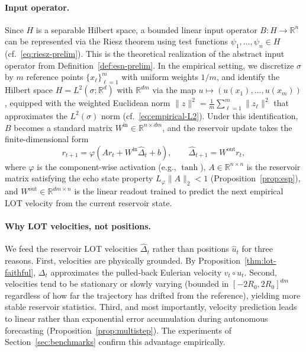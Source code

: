 \documentclass[11pt]{article}
\newcommand{\R}{\mathbb{R}}
\newcommand{\1}{\mathbf{1}}
\begin{document}
\paragraph{Input operator.}
Since $H$ is a separable Hilbert space, a bounded linear input operator $B: H \to \R^n$ can be represented via the Riesz theorem using test functions $\psi_1, \ldots, \psi_n \in H$ (cf.~\eqref{eq:riesz-prelim}). This is the theoretical realization of the abstract input operator from Definition~\ref{def:esn-prelim}. In the empirical setting, we discretize $\sigma$ by $m$ reference points $\{x_\ell\}_{\ell=1}^m$ with uniform weights $1/m$, and identify the Hilbert space $H = L^2(\sigma;\R^d)$ with $\R^{dm}$ via the map
$u \mapsto (u(x_1), \ldots, u(x_m))$, equipped with the weighted Euclidean norm $\|z\|^2 = \frac{1}{m}\sum_{\ell=1}^m \|z_\ell\|^2$ that approximates the $L^2(\sigma)$ norm (cf.~\eqref{eq:empirical-L2}). Under this identification, $B$ becomes a standard matrix
$W^{\mathrm{in}} \in \R^{n \times dm}$, and the reservoir update takes the finite-dimensional form
\begin{equation}\label{eq:rc-update-discrete}
  r_{t+1} = \varphi(A r_t + W^{\mathrm{in}} \hat{\Delta}_t + b),
  \qquad
  \widehat{\Delta}_{t+1} = W^{\mathrm{out}} r_t,
\end{equation}
where $\varphi$ is the component-wise activation (e.g., $\tanh$), $A \in
\R^{n \times n}$ is the reservoir matrix satisfying the echo state property
$L_\varphi \|A\|_2 < 1$ (Proposition~\ref{prop:esp}), and
$W^{\mathrm{out}} \in \R^{dm \times n}$ is the linear readout trained to predict the next empirical LOT velocity from the current reservoir state.

\paragraph{Why LOT velocities, not positions.}
We feed the reservoir LOT velocities $\hat{\Delta}_t$ rather than positions $\hat{u}_t$ for three reasons. First, velocities are physically grounded. By Proposition~\ref{thm:lot-faithful}, $\Delta_t$ approximates the pulled-back Eulerian velocity $v_t \circ u_t$.  Second, velocities tend to be stationary or slowly varying (bounded in $[-2R_0, 2R_0]^{dm}$ regardless of how far the trajectory has drifted from the reference), yielding more stable reservoir statistics.  Third, and most importantly,
velocity prediction leads to linear rather than exponential error accumulation during autonomous forecasting (Proposition~\ref{prop:multistep}). The experiments of
Section~\ref{sec:benchmarks} confirm this advantage empirically.
\end{document}
